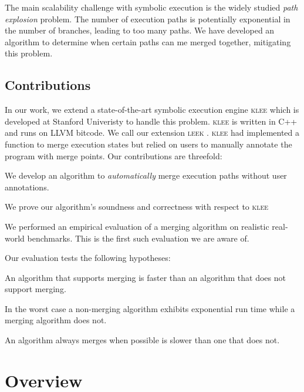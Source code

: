\documentclass[12pt,a4paper]{article}
\newcommand{\klee}{\textsc{klee }}
\newcommand{\leek}{\textsc{leek }}
\begin{document}
The main scalability challenge with symbolic execution is the widely studied \emph{path explosion} problem. The number of execution paths is potentially exponential in the number of branches, leading to too many paths. We have developed an algorithm to determine when certain paths can me merged together, mitigating this problem.

\subsection*{Contributions}

In our work, we extend a state-of-the-art symbolic execution engine \klee \cite{klee} which is developed at Stanford Univeristy to handle this problem. \klee is written in C++ and runs on LLVM bitcode. We call our extension \leek. \klee had implemented a function to merge execution states but relied on users to manually annotate the program with merge points. Our contributions are threefold:

\linespread{0}
\begin{enumerate*}

\item We develop an algorithm to \emph{automatically} merge execution paths without user annotations.
\item We prove our algorithm's soundness and correctness with respect to \klee
\item We performed an empirical evaluation of a merging algorithm on realistic real-world benchmarks. This is the first such evaluation we are aware of.

\end{enumerate*}

Our evaluation tests the following hypotheses:

\begin{enumerate*}
\item An algorithm that supports merging is faster than an algorithm that does not support merging.
\item In the worst case a non-merging algorithm exhibits exponential run time while a merging algorithm does not.
\item An algorithm always merges when possible is slower than one that does not.

\end{enumerate*}

\section*{Overview}\label{overview}
\end{document}
